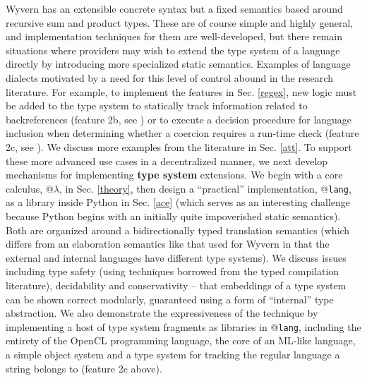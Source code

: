 Wyvern has an extensible concrete syntax but a fixed semantics based around recursive sum and product types. These are of course simple and highly general, and implementation techniques for them are well-developed, but there remain situations where providers may wish to extend the {type system} of a language directly by introducing more specialized static semantics. Examples of language dialects motivated by a need for this level of control abound in the research literature. For example, to implement the features in Sec. \ref{regex}, new logic must be added to the type system to statically track information related to backreferences (feature 2b, see \cite{spishak2012type}) or to execute a decision procedure for language inclusion when determining whether a coercion requires a run-time check (feature 2c, see \cite{fulton-thesis,HosoyaVouillonPierce2000ICFP}). We discuss more examples from the literature in Sec. \ref{att}. To support these more advanced use cases in a decentralized manner, we next develop mechanisms for implementing \textbf{type system} extensions. We begin with a core calculus, @$\lambda$, in Sec. \ref{theory}, then design a ``practical'' implementation, @\verb|lang|, as a library inside Python in Sec. \ref{ace} (which serves as an interesting challenge because Python begins with an initially quite impoverished static semantics). Both are organized around a bidirectionally typed translation semantics (which differs from an elaboration semantics like that used for Wyvern in that the external and internal languages have different type systems). We discuss issues including type safety (using techniques borrowed from the typed compilation literature), decidability and conservativity -- that embeddings of a type system can be shown correct modularly, guaranteed using a form of ``internal'' type abstraction. We also demonstrate the expressiveness of the technique by implementing a host of type system fragments as libraries in @\verb|lang|, including the entirety of the OpenCL programming language, the core of an ML-like language, a simple object system and a type system for tracking the regular language a string belongs to (feature 2c above).
